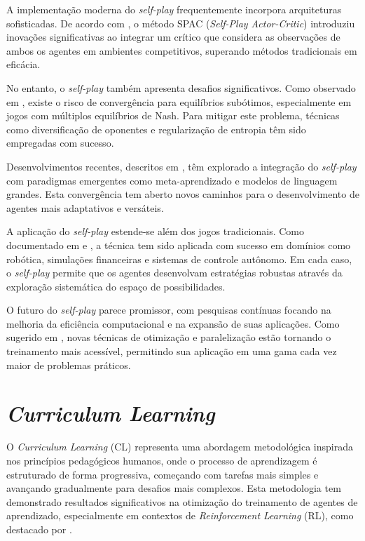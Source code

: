 A implementação moderna do \textit{self-play} frequentemente incorpora arquiteturas sofisticadas. De acordo com \cite{self_play_adversarial_critic}, o método SPAC (\textit{Self-Play Actor-Critic}) introduziu inovações significativas ao integrar um crítico que considera as observações de ambos os agentes em ambientes competitivos, superando métodos tradicionais em eficácia.

No entanto, o \textit{self-play} também apresenta desafios significativos. Como observado em \cite{provable_self_play}, existe o risco de convergência para equilíbrios subótimos, especialmente em jogos com múltiplos equilíbrios de Nash. Para mitigar este problema, técnicas como diversificação de oponentes e regularização de entropia têm sido empregadas com sucesso.

Desenvolvimentos recentes, descritos em \cite{survey_self_play} \cite{survey_self_play_2024}, têm explorado a integração do \textit{self-play} com paradigmas emergentes como meta-aprendizado e modelos de linguagem grandes. Esta convergência tem aberto novos caminhos para o desenvolvimento de agentes mais adaptativos e versáteis.

A aplicação do \textit{self-play} estende-se além dos jogos tradicionais. Como documentado em \cite{survey_self_play_2024} e \cite{bruno_brandao}, a técnica tem sido aplicada com sucesso em domínios como robótica, simulações financeiras e sistemas de controle autônomo. Em cada caso, o \textit{self-play} permite que os agentes desenvolvam estratégias robustas através da exploração sistemática do espaço de possibilidades.

O futuro do \textit{self-play} parece promissor, com pesquisas contínuas focando na melhoria da eficiência computacional e na expansão de suas aplicações. Como sugerido em \cite{huggingface_self_play}, novas técnicas de otimização e paralelização estão tornando o treinamento mais acessível, permitindo sua aplicação em uma gama cada vez maior de problemas práticos.

\section{\textit{Curriculum Learning}}
\label{sec:curriculum}

O \textit{Curriculum Learning} (CL) representa uma abordagem metodológica inspirada nos princípios pedagógicos humanos, onde o processo de aprendizagem é estruturado de forma progressiva, começando com tarefas mais simples e avançando gradualmente para desafios mais complexos. Esta metodologia tem demonstrado resultados significativos na otimização do treinamento de agentes de aprendizado, especialmente em contextos de \textit{Reinforcement Learning} (RL), como destacado por \cite{curriculum_learning_a_survey}.

